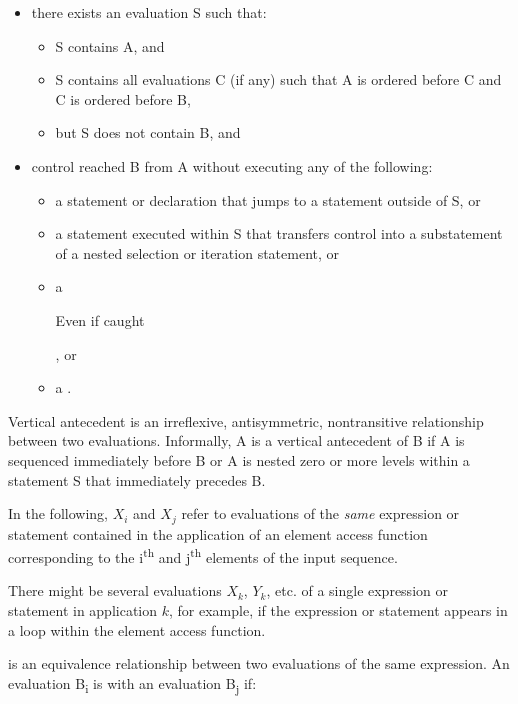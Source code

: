 \begin{itemize}
\item there exists an evaluation S such that:
  \begin{itemize}
    \item S contains A, and
    \item S contains all evaluations C (if any) such that A is ordered before C and C is ordered before B,
    \item but S does not contain B, and
  \end{itemize}
\item control reached B from A without executing any of the following:
  \begin{itemize}
    \item a  statement or  declaration that jumps to a statement outside of S, or
    \item a  statement executed within S that transfers control into a substatement of a nested selection or iteration statement, or
    \item a  \begin{note}Even if caught\end{note}, or
    \item a .
  \end{itemize}
\end{itemize}

\begin{note}
Vertical antecedent is an irreflexive, antisymmetric, nontransitive relationship between two evaluations. Informally, A is a vertical antecedent of B if A is sequenced immediately before B or A is nested zero or more levels within a statement S that immediately precedes B.
\end{note}

\pnum In the following, $X_i$ and $X_j$ refer to evaluations of the {\em same} expression
or statement contained in the application of an element access function
corresponding to the i\textsuperscript{th} and j\textsuperscript{th} elements of the input sequence.
\begin{note}There might be several evaluations $X_k$, $Y_k$, etc. of a single
expression or statement in application $k$, for example, if the expression or
statement appears in a loop within the element access function.\end{note}

\pnum {} is an equivalence relationship between two
evaluations of the same expression. An evaluation B\textsubscript{i} is
 with an evaluation B\textsubscript{j} if:

